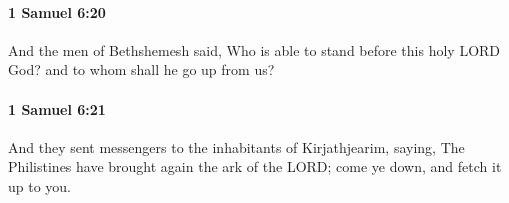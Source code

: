 		\paragraph{1 Samuel 6:20} %
			\label{1SAMUEL-6-20}

			And the men of Bethshemesh said, Who is able to stand before this holy LORD God? and to whom shall he go up from us?


		\paragraph{1 Samuel 6:21} %
			\label{1SAMUEL-6-21}

			And they sent messengers to the inhabitants of Kirjathjearim, saying, The Philistines have brought again the ark of the LORD; come ye down, and fetch it up to you.

